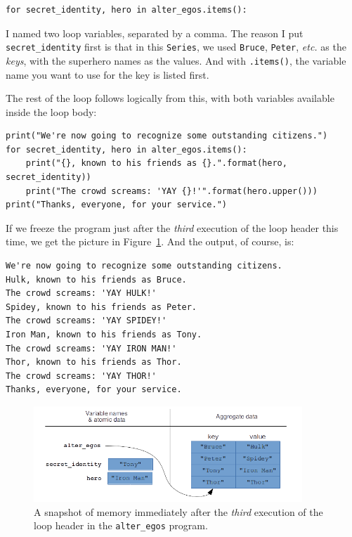 \begin{Verbatim}[fontsize=\normalsize,samepage=true,frame=single,framesep=3mm]
for secret_identity, hero in alter_egos.items():
\end{Verbatim}

I named two loop variables, separated by a comma. The reason I put
\texttt{secret\_identity} first is that in this \texttt{Series}, we used
\texttt{Bruce}, \texttt{Peter}, \textit{etc.} as the \textit{keys}, with the
superhero names as the values. And with \texttt{.items()}, the variable name
you want to use for the key is listed first.

The rest of the loop follows logically from this, with both variables available
inside the loop body:

\begin{Verbatim}[fontsize=\small,samepage=true,frame=single,framesep=3mm]
print("We're now going to recognize some outstanding citizens.")
for secret_identity, hero in alter_egos.items():
    print("{}, known to his friends as {}.".format(hero, secret_identity))
    print("The crowd screams: 'YAY {}!'".format(hero.upper()))
print("Thanks, everyone, for your service.")
\end{Verbatim}

If we freeze the program just after the \textit{third} execution of the loop
header this time, we get the picture in Figure~\ref{fig:loopsMemory2}. And the
output, of course, is:

\begin{Verbatim}[fontsize=\small,samepage=true,frame=leftline,framesep=5mm,framerule=1mm]
We're now going to recognize some outstanding citizens.
Hulk, known to his friends as Bruce.
The crowd screams: 'YAY HULK!'
Spidey, known to his friends as Peter.
The crowd screams: 'YAY SPIDEY!'
Iron Man, known to his friends as Tony.
The crowd screams: 'YAY IRON MAN!'
Thor, known to his friends as Thor.
The crowd screams: 'YAY THOR!'
Thanks, everyone, for your service.
\end{Verbatim}

\begin{figure}[ht]
\centering
\includegraphics[width=0.9\textwidth]{loopsMemory2.png}
\caption{A snapshot of memory immediately after the \textit{third} execution
of the loop header in the \texttt{alter\_egos} program.}
\label{fig:loopsMemory2}
\end{figure}

